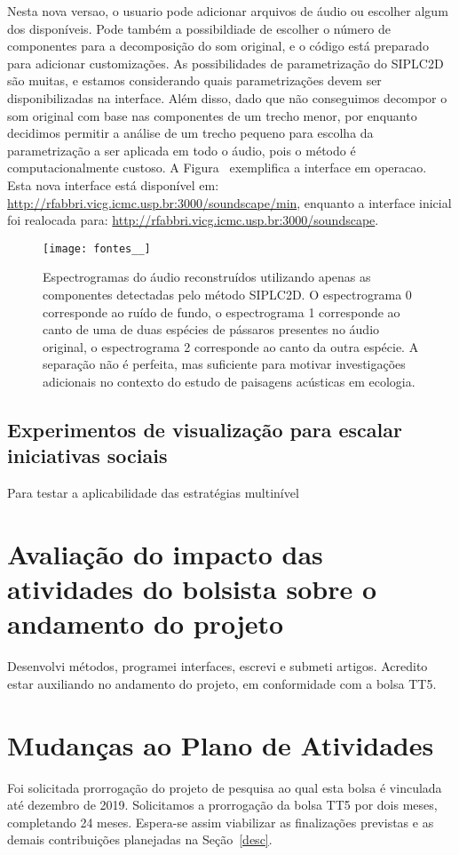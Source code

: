 \documentclass[a4paper, 11pt]{article}
\begin{document}
Nesta nova versao, o usuario pode adicionar arquivos de áudio ou escolher algum dos disponíveis.
Pode também a possibildiade de escolher o número de componentes para a decomposição do som original,
e o código está preparado para adicionar customizações.
As possibilidades de parametrização do SIPLC2D são muitas, e estamos considerando quais
parametrizações devem ser disponibilizadas na interface.
Além disso, dado que não conseguimos decompor o som original com base nas componentes de um
trecho menor, por enquanto decidimos permitir a análise de um trecho pequeno para escolha da
parametrização a ser aplicada em todo o áudio, pois o método é computacionalmente custoso.
A Figura~\cite{ps} exemplifica a interface em operacao.
Esta nova interface está disponível em: \url{http://rfabbri.vicg.icmc.usp.br:3000/soundscape/min},
enquanto a interface inicial foi realocada para: \url{http://rfabbri.vicg.icmc.usp.br:3000/soundscape}.


\begin{figure}[h!]
\centering
  \texttt{[image: fontes\_\_]}
\caption{%
  Espectrogramas do áudio reconstruídos utilizando apenas
  as componentes detectadas pelo método SIPLC2D.
  O espectrograma 0 corresponde ao ruído de fundo,
  o espectrograma 1 corresponde ao canto de uma de duas espécies de pássaros
  presentes no áudio original,
  o espectrograma 2 corresponde ao canto da outra espécie.
  A separação não é perfeita, mas suficiente para motivar investigações adicionais no contexto do estudo de paisagens acústicas em ecologia.
}\label{ps}
\end{figure}

\subsection{Experimentos de visualização para escalar iniciativas sociais}
Para testar a aplicabilidade das estratégias multinível 

\section{Avaliação do impacto das atividades do bolsista sobre o andamento do projeto}
Desenvolvi métodos, programei interfaces, escrevi e submeti artigos.
Acredito estar auxiliando no andamento do projeto, em conformidade com a bolsa TT5.

\section{Mudanças ao Plano de Atividades}
Foi solicitada prorrogação do projeto de pesquisa ao qual esta bolsa é vinculada até dezembro de 2019. Solicitamos a prorrogação da bolsa TT5 por dois meses, completando 24 meses. Espera-se assim viabilizar as finalizações previstas e as demais contribuições planejadas na Seção~\ref{desc}.
\end{document}
